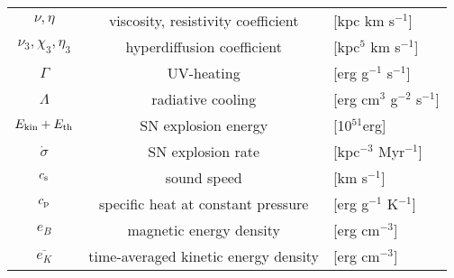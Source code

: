 \documentclass[preprint2]{aastex63}
\newcommand\latex{La\TeX}
\newcommand\ESK{E_{\rm kin}}
\newcommand\EST{E_{\rm th}}
\newcommand{\fag}[1]{\textcolor{midgreen}{FAG: #1}}
\begin{document}
\begin{table*}[h]
\begin{tabular}{ccl}
 $\nu,\eta$ & viscosity, resistivity coefficient& [kpc km s$^{-1}$]\\
 $\nu_3,\chi_3,\eta_3$ & hyperdiffusion coefficient& [kpc$^{5}$ km s$^{-1}$]\\
 $\Gamma$ & UV-heating& [erg g$^{-1}$ s$^{-1}$]\\
 $\Lambda$ & radiative cooling& [erg cm$^{3}$ g$^{-2}$ s$^{-1}$]\\
 $\ESK+\EST$ & SN explosion energy& [10$^{51}$erg]\\
 $\dot\sigma$ & SN explosion rate & [kpc$^{-3}$ Myr$^{-1}$]\\
 $c_{\rm s}$ & sound speed & [km s$^{-1}$]\\
 $c_{\rm p}$ & specific heat at constant pressure & [erg g$^{-1}$ K$^{-1}$]\\
 $e_B$ & magnetic energy density & [erg cm$^{-3}$]\\
 $\overline{e_K}$ & time-averaged kinetic energy density & [erg cm$^{-3}$]\\
\hline
\end{tabular}
\end{table*}


\end{document}
